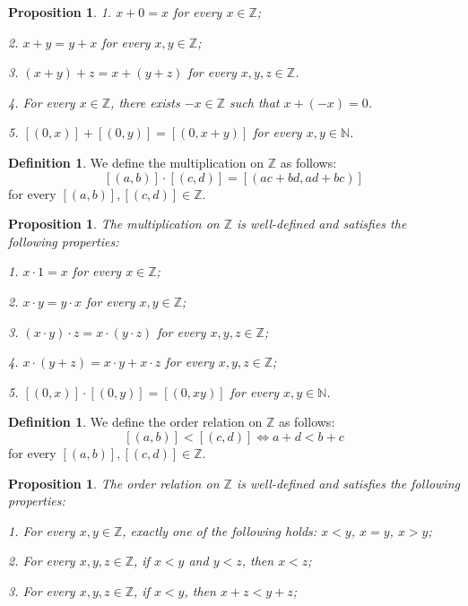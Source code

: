 \documentclass[12pt, reqno]{amsart}
\newtheorem{proposition}[theorem]{Proposition}
\theoremstyle{definition}
\newtheorem{definition}[theorem]{Definition}
\theoremstyle{remark}
\numberwithin{equation}{section}
\begin{document}
{\begin{proposition}
    1. $x + 0 = x$ for every $x\in \mathbb{Z}$;

    2. $x + y = y + x$ for every $x, y \in \mathbb{Z}$;

    3. $(x + y) + z = x + (y + z)$ for every $x, y, z \in \mathbb{Z}$.

    4. For every $x\in \mathbb{Z}$, there exists $-x \in \mathbb{Z}$ such that $x + (-x) = 0$.
    
    5. $[(0, x)] + [(0,y)] = [(0, x + y)]$ for every $x, y \in \mathbb{N}$.
\end{proposition}

\begin{definition}
    We define the multiplication on $\mathbb{Z}$ as follows:
    \[
        [(a, b)] \cdot [(c, d)] = [(ac + bd, ad + bc)]
    \]
    for every $[(a, b)], [(c, d)] \in \mathbb{Z}$.
\end{definition}

\begin{proposition}
    The multiplication on $\mathbb{Z}$ is well-defined and satisfies the following properties:

    1. $x \cdot 1 = x$ for every $x\in \mathbb{Z}$;

    2. $x \cdot y = y \cdot x$ for every $x, y \in \mathbb{Z}$;

    3. $(x \cdot y) \cdot z = x \cdot (y \cdot z)$ for every $x, y, z \in \mathbb{Z}$;

    4. $x \cdot (y + z) = x \cdot y + x \cdot z$ for every $x, y, z \in \mathbb{Z}$;

    5. $[(0, x)] \cdot [(0,y)] = [(0, xy)]$ for every $x, y \in \mathbb{N}$.
\end{proposition}

\begin{definition}
    We define the order relation on $\mathbb{Z}$ as follows:
    \[
        [(a, b)] < [(c, d)] \iff a + d < b + c
    \]
    for every $[(a, b)], [(c, d)] \in \mathbb{Z}$.
\end{definition}

\begin{proposition}
    The order relation on $\mathbb{Z}$ is well-defined and satisfies the following properties:

    1. For every $x, y \in \mathbb{Z}$, exactly one of the following holds: $x < y$, $x = y$, $x > y$;

    2. For every $x, y, z \in \mathbb{Z}$, if $x < y$ and $y < z$, then $x < z$;

    3. For every $x, y, z \in \mathbb{Z}$, if $x < y$, then $x + z < y + z$;


\end{proposition}}
\end{document}
